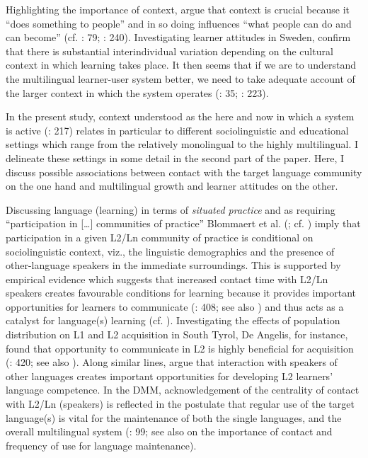 \documentclass[output=paper]{../langscibook}
\begin{document}
Highlighting the importance of context, \citet[203]{BlommaertEtAl2005} argue that context is crucial because it “does something to people” and in so doing influences “what people can do and can become” (cf. \citealt{Cenoz2013Influence}: 79; \citealt{VanGeertEtAl2011}: 240). Investigating learner attitudes in Sweden, \citet[611]{HenryApelgren2008} confirm that there is substantial interindividual variation depending on the cultural context in which learning takes place. It then seems that if we are to understand the multilingual learner-user system better, we need to take adequate account of the larger context in which the system operates (\citealt{Larsen-FreemanCameron2008}: 35; \citealt{PaladinoVaes2009}: 223). 

In the present study, context understood as the here and now in which a system is active (\citealt{ThelenSmith1994}: 217) relates in particular to different sociolinguistic and educational settings which range from the relatively monolingual to the highly multilingual. I delineate these settings in some detail in the second part of the paper. Here, I discuss possible associations between contact with the target language community on the one hand and multilingual growth and learner attitudes on the other.

Discussing language (learning) in terms of \emph{situated practice} and as requiring “participation in […] communities of practice” Blommaert et al. (\citeyear[206]{BlommaertEtAl2005}; cf. \citealt[81]{Cenoz2013Influence}) imply that participation in a given L2/Ln community of practice is conditional on sociolinguistic context, viz., the linguistic demographics and the presence of other-language speakers in the immediate surroundings. This is supported by empirical evidence which suggests that increased contact time with L2/Ln speakers creates favourable conditions for learning because it provides important opportunities for learners to communicate (\citealt{DeAngelis2012}: 408; see also \citealt{Kordt2018}) and thus acts as a catalyst for language(s) learning (cf. \citealt{Bozzo2014}). Investigating the effects of population distribution on L1 and L2 acquisition in South Tyrol, De Angelis, for instance, found that opportunity to communicate in L2 is highly beneficial for acquisition (\citealt{DeAngelis2012}: 420; see also \citealt{DeAngelisNodate}). Along similar lines, \citet[63]{CsizerKormos2009} argue that interaction with speakers of other languages creates important opportunities for developing L2 learners’ language competence. In the DMM, acknowledgement of the centrality of contact with L2/Ln (speakers) is reflected in the postulate that regular use of the target language(s) is vital for the maintenance of both the single languages, and the overall multilingual system (\citealt{HerdinaJessner2002}: 99; see also \citealt[158]{Schmid2011} on the importance of contact and frequency of use for language maintenance).
\end{document}

